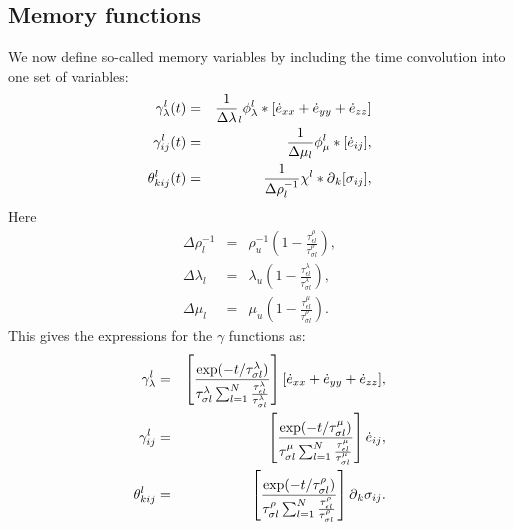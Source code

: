 \documentclass[11pt]{article}
\begin{document}
\subsection*{Memory functions} 
We now define so-called memory variables by including the time convolution into one set of variables:
\begin{eqnarray}
 \gamma^l_{\lambda}(t) 
  & =& \frac{1}{\Delta\lambda}_l \phi^l_{\lambda}
       *[\dot{e}_{xx}+\dot{e}_{yy}+\dot{e}_{zz}]\label{eq:gamma-l} \\ 
 \gamma^l_{ij}(t) 
  & =& \frac{1}{\Delta\mu_l}\phi^l_{\mu}
       *[\dot{e}_{ij}],                         \label{eq:gamma-l} \\
 \theta^l_{kij}(t) 
  & =& \frac{1}{\Delta\rho^{-1}_l}\chi^l*\mbox{$\partial$}_k[\sigma_{ij}],  
                                                \label{eq:theta-l}
\end{eqnarray}
Here 
\begin{eqnarray}
  \Delta\rho^{-1}_l 
     & = & \rho^{-1}_u\left(1-\frac{\tau^{\rho}_{\epsilon l}}
                                   {\tau^{\rho}_{\sigma l}}\right),    \\
 \Delta\lambda_l                              
     & = & \lambda_u\left(1-\frac{\tau^{\lambda}_{\epsilon l}}
                              {\tau^{\lambda}_{\sigma l}}\right),      \\
 \Delta\mu_l                              
     & = & \mu_u\left(1-\frac{\tau^{\mu}_{\epsilon l}}
                              {\tau^{\rho}_{\sigma l}}\right).         
\end{eqnarray}
This gives the expressions for the $\gamma$ functions as:
\begin{eqnarray}
 \gamma^l_{\lambda}    
    & = & \left[\frac{\exp(-t/\tau^{\lambda}_{\sigma l})}
                     {\tau^{\lambda}_{\sigma l}
                     \sum_{l=1}^N \frac{\tau^{\lambda}_{\epsilon l}}
                     {\tau^{\lambda}_{\sigma l}}}\right] 
                     [\dot{e}_{xx}+\dot{e}_{yy}+\dot{e}_{zz}],       \\
 \gamma^l_{ij}    
   & = & \left[\frac{\exp(-t/\tau^{\mu}_{\sigma l})}
                     {\tau^{\mu}_{\sigma l}
                     \sum_{l=1}^N \frac{\tau^{\mu}_{\epsilon l}}
                     {\tau^{\mu}_{\sigma l}}}\right] 
                     \dot{e}_{ij},                                   \\
 \theta^l_{kij}    
   & = & \left[\frac{\exp(-t/\tau^{\rho}_{\sigma l})}
                    {\tau^{\rho}_{\sigma l}
                    \sum_{l=1}^N \frac{\tau^{\rho}_{\epsilon l}}
                    {\tau^{\rho}_{\sigma l}}}\right] 
                    \mbox{$\partial$}_k \sigma_{ij}.
\end{eqnarray}
\end{document}
